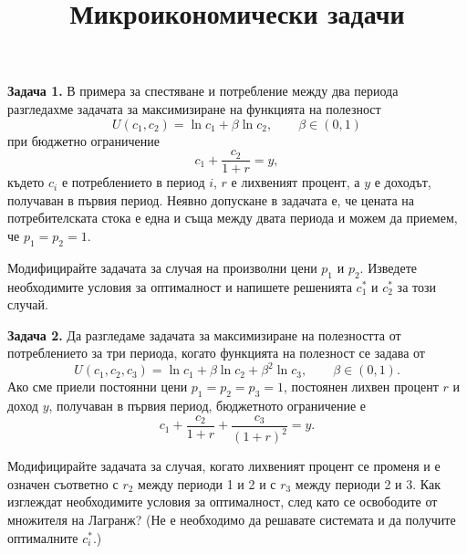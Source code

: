\documentclass[10pt,a4paper]{article}
\title{Микроикономически задачи}
\date{}
\begin{document}
	\maketitle

\textbf{Задача 1.} В примера за спестяване и потребление между два периода разгледахме задачата за максимизиране на функцията на полезност \[ U(c_1,c_2) = \ln c_1 + \beta \ln c_2, \qquad \beta \in (0,1) \] при бюджетно ограничение \[ c_1 + \dfrac{c_2}{1+r} = y, \]
където $ c_i $ е потреблението в период $ i $, $ r $ е лихвеният процент, а $ y $ е доходът, получаван в първия период. Неявно допускане в задачата е, че цената на потребителската стока е една и съща между двата периода и можем да приемем, че $ p_1=p_2=1 $.

Модифицирайте задачата за случая на произволни цени $ p_1 $ и $ p_2 $. Изведете необходимите условия за оптималност и напишете решенията $ c^*_1 $ и $ c^*_2 $  за този случай.

\bigskip

\textbf{Задача 2.} Да разгледаме задачата за максимизиране на полезността от потреблението за три периода, когато функцията на полезност се задава от \[ U(c_1,c_2,c_3) = \ln c_1 + \beta \ln c_2 + \beta^2 \ln c_3, \qquad \beta \in (0,1). \]
Ако сме приели постоянни цени $ p_1 = p_2 = p_3 = 1 $, постоянен лихвен процент $ r $ и доход $ y $, получаван в първия период, бюджетното ограничение е \[ c_1 + \dfrac{c_2}{1+r} + \dfrac{c_3}{(1+r)^2} = y. \]

Модифицирайте задачата за случая, когато лихвеният процент се променя и е означен съответно с $ r_2 $ между периоди 1 и 2 и с $ r_3 $ между периоди 2 и 3. Как изглеждат необходимите условия за оптималност, след като се освободите от множителя на Лагранж? (Не е необходимо да решавате системата и да получите оптималните $ c^*_i $.)
\end{document}
